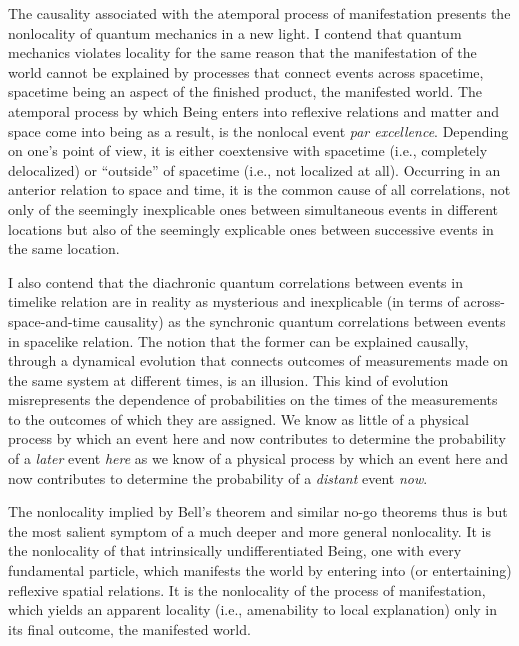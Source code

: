 The causality associated with the atemporal process of manifestation presents the nonlocality of quantum mechanics in a new light. I contend that quantum mechanics violates locality for the same reason that the manifestation of the world cannot be explained by processes that connect events across spacetime, spacetime being an aspect of the finished product, the manifested world. The  atemporal process by which Being enters into reflexive relations and matter and space come into being as a result, is the nonlocal event \emph{par excellence}. Depending on one's point of view, it is either coextensive with spacetime (i.e., completely delocalized) or ``outside'' of spacetime (i.e., not localized at all). Occurring in an anterior relation to space and time, it is the common cause of all correlations, not only of the seemingly inexplicable ones between simultaneous events in different locations but also of the seemingly explicable ones between successive events in the same location.

I also contend that the diachronic quantum correlations between events in timelike relation are in reality as mysterious and inexplicable (in terms of across-space-and-time causality) as the synchronic quantum correlations between events in spacelike relation. The notion that the former can be explained causally, through a dynamical evolution that connects outcomes of measurements made on the same system at different times, is an illusion. This kind of evolution misrepresents the dependence of probabilities on the times of the measurements to the outcomes of which they are assigned. We know as little of a physical process by which an event here and now contributes to determine the probability of a \emph{later} event \emph{here} as we know of a physical process by which an event here and now contributes to determine the probability of a \emph{distant} event \emph{now}.

The nonlocality implied by Bell's theorem and similar no-go theorems thus is but the most salient symptom of a much deeper and more general nonlocality. It is the nonlocality of that intrinsically undifferentiated Being, one with every fundamental particle, which manifests the world by entering into (or entertaining) reflexive spatial relations. It is the nonlocality of the process of manifestation, which yields an apparent locality (i.e., amenability to local explanation) only in its final outcome, the manifested world.

